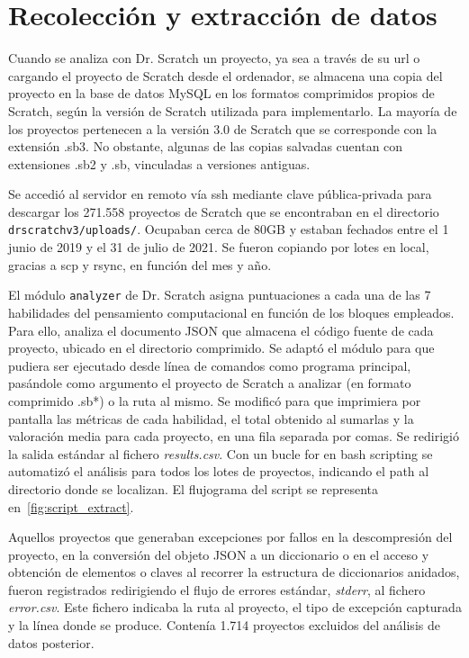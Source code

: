 \documentclass[a4paper, 12pt]{book}
\begin{document}
\section{Recolección y extracción de datos}  
\label{sec:collect_data}

Cuando se analiza con Dr. Scratch un proyecto, ya sea a través de su url o cargando el proyecto de Scratch desde el ordenador, se almacena una copia del proyecto en la base de datos MySQL en los formatos comprimidos propios de Scratch, según la versión de Scratch utilizada para implementarlo. La mayoría de los proyectos pertenecen a la versión 3.0 de Scratch que se corresponde con la extensión .sb3. No obstante, algunas de las copias salvadas cuentan con extensiones .sb2 y .sb, vinculadas a versiones antiguas. 

Se accedió al servidor en remoto vía ssh mediante clave pública-privada para descargar los 271.558 proyectos de Scratch que se encontraban en el directorio \texttt{drscratchv3/uploads/}. Ocupaban cerca de 80GB y estaban fechados entre el 1 junio de 2019 y el 31 de julio de 2021. Se fueron copiando por lotes en local, gracias a scp y rsync, en función del mes y año. 

El módulo \texttt{analyzer} de Dr. Scratch asigna puntuaciones a cada una de las 7 habilidades del pensamiento computacional en función de los bloques empleados. Para ello, analiza el documento JSON que almacena el código fuente de cada proyecto, ubicado en el directorio comprimido. Se adaptó el módulo para que pudiera ser ejecutado desde línea de comandos como programa principal, pasándole como argumento el proyecto de Scratch a analizar (en formato comprimido .sb*) o la ruta al mismo. Se modificó para que imprimiera por pantalla las métricas de cada habilidad, el total obtenido al sumarlas y la valoración media para cada proyecto, en una fila separada por comas. Se redirigió la salida estándar al fichero \emph{results.csv}.  
Con un bucle for en bash scripting se automatizó el análisis para todos los lotes de proyectos, indicando el path al directorio donde se localizan. El flujograma del script se representa en~\ref{fig:script_extract}.

Aquellos proyectos que generaban excepciones por fallos en la descompresión del proyecto, en la conversión del objeto JSON a un diccionario o en el acceso y obtención de elementos o claves al recorrer la estructura de diccionarios anidados, fueron registrados redirigiendo el flujo de errores estándar, \emph{stderr}, al fichero \emph{error.csv}. Este fichero indicaba la ruta al proyecto, el tipo de excepción capturada y la línea donde se produce. Contenía 1.714 proyectos excluidos del análisis de datos posterior.
\end{document}
